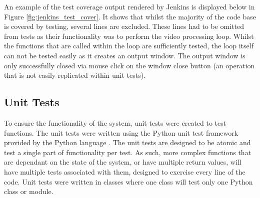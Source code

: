 An example of the test coverage output rendered by Jenkins is displayed below in Figure \ref{fig:jenkins_test_cover}. It shows that whilst the majority of the code base is covered by testing, several lines are excluded. These lines had to be omitted from tests as their functionality was to perform the video processing loop. Whilst the functions that are called within the loop are sufficiently tested, the loop itself can not be tested easily as it creates an output window. The output window is only successfully closed via mouse click on the window close button (an operation that is not easily replicated within unit tests).
\begin{figure}[h!]
\end{figure}
 

\subsection{Unit Tests}
To ensure the functionality of the system, unit tests were created to test functions. The unit tests were written using the Python unit test framework provided by the Python language \cite{python_unittest}. The unit tests are designed to be atomic and test a single part of functionality per test. As such, more complex functions that are dependant on the state of the system, or have multiple return values, will have multiple tests associated with them, designed to exercise every line of the code. Unit tests were written in classes where one class will test only one Python class or module.

